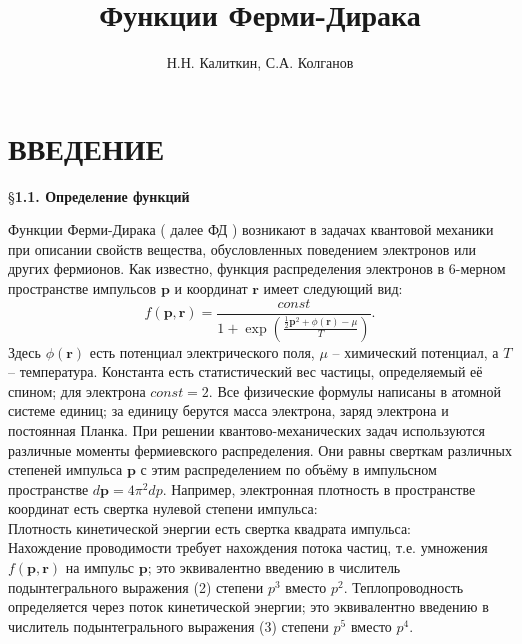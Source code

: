 \documentclass[11pt,a4paper]{book}
\begin{document}
\title{Функции Ферми-Дирака}
\author{Н.Н. Калиткин, С.А. Колганов}
\maketitle

\tableofcontents
\chapter{ВВЕДЕНИЕ}

\S \textbf{1.1. Определение функций}

Функции Ферми-Дирака ( далее ФД ) возникают в задачах квантовой механики при описании свойств вещества, обусловленных поведением электронов или других фермионов. Как известно, функция распределения электронов в 6-мерном пространстве импульсов $\textbf{p}$ и координат $\textbf{r}$ имеет следующий вид:
\begin{equation}f(\textbf{p},\textbf{r})=\frac{const}{1+\exp{(\frac{\frac{1}{2}\textbf{p}^2+\phi(\textbf{r})-\mu}{T})}}.
\end{equation}
Здесь $\phi(\textbf{r})$ есть потенциал электрического поля, $\mu$ – химический потенциал, а $T$ – температура. Константа есть статистический вес частицы, определяемый её спином; для электрона $const = 2$. Все физические формулы написаны в атомной системе единиц; за единицу берутся масса электрона, заряд электрона и постоянная Планка.
\indent
\newline
При решении квантово-механических задач используются различные моменты фермиевского распределения. Они равны сверткам различных степеней импульса $\textbf{p}$ с этим распределением по объёму в импульсном пространстве $d\textbf{p}=4\pi^2dp$. Например, электронная плотность в пространстве координат есть свертка нулевой степени импульса:
\begin{equation}
\end{equation}
Плотность кинетической энергии есть свертка квадрата импульса:
\begin{equation}
\end{equation}
Нахождение проводимости требует нахождения потока частиц, т.е. умножения $f(\textbf{p}, \textbf{r})$ на импульс $\textbf{p}$; это эквивалентно введению в числитель подынтегрального выражения (2) степени $p^3$ вместо $p^2$. Теплопроводность определяется через поток кинетической энергии; это эквивалентно введению в числитель подынтегрального выражения (3) степени $p^5$ вместо $p^4$.
\end{document}
